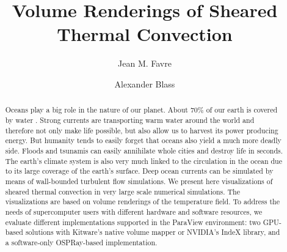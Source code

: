 \documentclass[final,5p,times,twocolumn]{elsarticle}
\begin{document}
\begin{frontmatter}



\title{Volume Renderings of Sheared Thermal Convection}


\author[CSCS]{Jean M. Favre}
\author[Twente]{Alexander Blass}

\address[CSCS]{Swiss National Supercomputing Center (CSCS), Via Trevano 131, CH-6900 Lugano, Switzerland}
\address[Twente]{Physics of Fluids Group, Max Planck Center for Complex Fluid Dynamics,
J. M. Burgers Center for Fluid Dynamics and MESA+ Research Institute,
Department of Science and Technology,
University of Twente, P.O. Box 217, 7500 AE Enschede, The Netherlands}

\begin{abstract}
Oceans play a big role in the nature of our planet. About $ 70 \% $ of our earth
is covered by water \cite{int14}. Strong currents are transporting warm water around the world
and therefore not only make life possible, but also allow us to harvest its
power producing energy. But humanity tends to easily forget that oceans also
yield a much more deadly side. Floods and tsunamis can easily annihilate whole
cities and destroy life in seconds. The earth's climate system is also very much
linked to the circulation in the ocean due to its large coverage of the earth's surface.
Deep ocean currents can be simulated by means of wall-bounded turbulent flow simulations. We present here visualizations of sheared thermal convection in very large scale numerical simulations.
The visualizations are based on volume renderings of the temperature field. To address the needs of supercomputer users
with different hardware and software resources, we evaluate different implementations
supported in the ParaView \cite{Ahrens2005} environment: two GPU-based solutions
with Kitware's native volume mapper or NVIDIA's IndeX library, and a software-only
OSPRay-based implementation.


\end{abstract}
\end{frontmatter}
\end{document}
